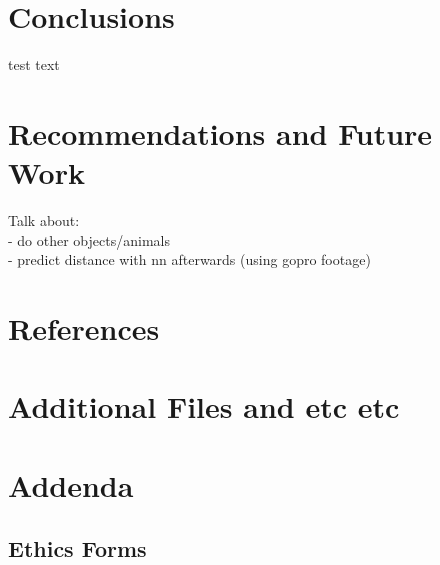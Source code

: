 \documentclass{article}
\begin{document}
\section{Conclusions}
test text

\section{Recommendations and Future Work}
Talk about: \\
- do other objects/animals \\
- predict distance with nn afterwards (using gopro footage)

\section{References}

\appendix
\section{Additional Files and etc etc}

\section{Addenda}
\subsection{Ethics Forms}

\end{document}
